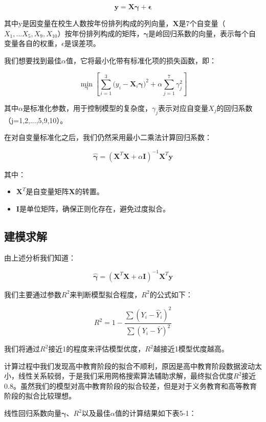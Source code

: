 \documentclass[UTF8, zihao=-4]{ctexart}
\begin{document}
	  \[
	  \bm{y} = \bm{X} \bm{\gamma} + \bm{\epsilon}
	  \]
	  
	  其中y是因变量在校生人数按年份排列构成的列向量，$\bm{X}$是7个自变量（$X_1,...X_5,X_9,X_{10}$）按年份排列构成的矩阵，$\bm{\gamma}$是岭回归系数的向量，表示每个自变量各自的权重，$\epsilon$是误差项。
	  
	  我们想要找到最佳$\alpha$值，它将最小化带有标准化项的损失函数，即：
	  
	  \[
	  \min_{\bm{\gamma}}[\sum_{i=1}^{3}(y_i - \bm{X}_i{\bm{\gamma})^2} + \alpha\sum_{j=1}^{7}\gamma_j^2]
	  \]
	  
	  其中$\alpha$是标准化参数，用于控制模型的复杂度，$\gamma_j$表示对应自变量$X_j$的回归系数（j=1,2,...,5,9,10）。
	  
	  在对自变量标准化之后，我们仍然采用最小二乘法计算回归系数：
	  
	  \[
	  \hat{\bm{\gamma}} = (\bm{X}^T\bm{X}+\alpha \bm{I})^{-1}\bm{X}^T\bm{y}
	  \]
	  
	  其中：
	  \begin{itemize}
	  	\item $\bm{X}^T$是自变量矩阵$\bm{X}$的转置。
	  	\item $\bm{I}$是单位矩阵，确保正则化存在，避免过度拟合。
	  \end{itemize}
	 \subsection{建模求解}
	 由上述分析我们知道：
	 
	 \[
	 \hat{\bm{\gamma}} = (\bm{X}^T\bm{X}+\alpha \bm{I})^{-1}\bm{X}^T\bm{y}
	 \]
	 
	 我们主要通过参数$R^2$来判断模型拟合程度，$R^2$的公式如下：
	 
	 \[
	 R^2 = 1 - \frac{\sum(Y_i - \hat{Y}_i)^2}{\sum(Y_i - \bar{Y})^2}
	 \]
	 
	 我们将通过$R^2$接近1的程度来评估模型优度，$R^2$越接近1模型优度越高。
	 
	 计算过程中我们发现高中教育阶段的拟合不顺利，原因是高中教育阶段数据波动太小，线性关系较弱，于是我们采用网格搜索算法辅助求解，最终拟合优度$R^2$接近0.8。虽然我们的模型对高中教育阶段的拟合较差，但是对于义务教育和高等教育阶段的拟合比较理想。
	 
	 线性回归系数向量$\bm{\gamma}$、$R^2$以及最佳$\alpha$值的计算结果如下表5-1：
	 
\end{document}
